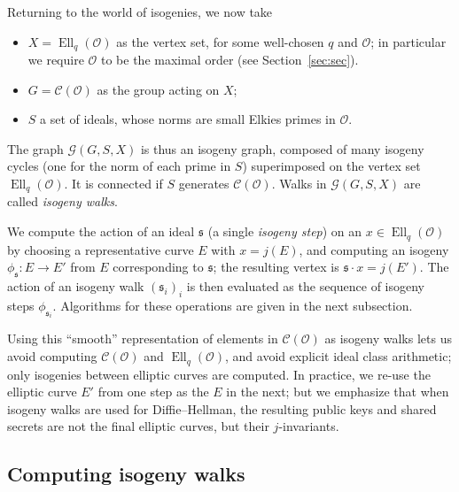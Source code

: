 \documentclass{llncs}
\newcommand{\Cl}{\mathcal{C}}
\newcommand{\Graph}{\mathcal{G}}
\renewcommand{\O}{\mathcal{O}}
\renewcommand{\frak}{\mathfrak}
\DeclareMathOperator{\Ell}{Ell}
\begin{document}
Returning to the world of isogenies,
we now take
\begin{itemize}
    \item $X=\Ell_q(\O)$ as the vertex set, for some well-chosen $q$ and $\O$;
        in particular we require $\O$ to be the maximal order (see Section~\ref{sec:sec}).
    \item $G=\Cl(\O)$ as the group acting on $X$;
    \item $S$ a set of ideals, whose norms are small Elkies primes in $\O$.
\end{itemize}
The graph $\Graph(G,S,X)$ is thus an isogeny graph, 
composed of many isogeny cycles (one for the norm of each prime in $S$) 
superimposed on the vertex set $\Ell_q(\O)$.
It is connected if $S$ generates $\Cl(\O)$.
Walks in $\Graph(G,S,X)$ are called \emph{isogeny walks}.

We compute the action of
an ideal $\frak s$ (a single \emph{isogeny step})
on an $x∈\Ell_q(\O)$ 
by choosing a representative curve $E$ with $x = j(E)$,
and computing an isogeny $ϕ_{\frak s}:E→E'$ from $E$
corresponding to $\frak{s}$;
the resulting vertex is $\frak s \cdot x = j(E')$.
The action of an isogeny walk $(\frak s_i)_i$
is then evaluated as the sequence of isogeny steps $ϕ_{\frak s_i}$. 
Algorithms for these operations are given in the next subsection. 

Using this ``smooth'' representation of elements
in $\Cl(\O)$ as isogeny walks
lets us avoid computing $\Cl(\O)$ and $\Ell_q(\O)$,
and avoid explicit ideal class arithmetic;
only isogenies between elliptic curves are computed.
In practice, we re-use the elliptic curve $E'$ from one step
as the $E$ in the next;
but we emphasize that
when isogeny walks are used for Diffie--Hellman,
the resulting public keys and shared secrets
are not the final elliptic curves,
but their $j$-invariants.


\subsection{Computing isogeny walks}
\end{document}
